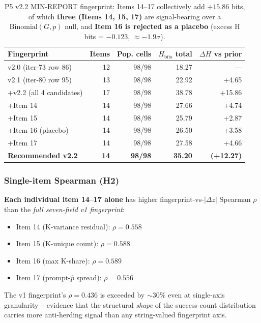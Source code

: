 \begin{table}[ht]
\centering
\small
\caption{P5 v2.2 MIN-REPORT fingerprint: Items 14--17 collectively add
$+15.86$ bits, of which \textbf{three (Items 14, 15, 17)} are signal-bearing
over a $\mathrm{Binomial}(G,p)$ null, and \textbf{Item 16 is rejected as
a placebo} (excess H bits = $-0.123$, $\approx -1.9\sigma$).}
\label{tab:p5-v22-uplift}
\begin{tabular}{l r r r r}
\toprule
Fingerprint & Items & Pop. cells & $H_{\mathrm{bits}}$ total & $\Delta H$ vs prior \\
\midrule
v2.0 (iter-73 row 86)        & 12  & 98/98 & 18.27 & --- \\
v2.1 (iter-80 row 95)        & 13  & 98/98 & 22.92 & +4.65 \\
+v2.2 (all 4 candidates)     & 17  & 98/98 & 38.78 & +15.86 \\
\quad +Item 14               & 14 & 98/98 & 27.66 & +4.74 \\
\quad +Item 15               & 14 & 98/98 & 25.79 & +2.87 \\
\quad +Item 16 (placebo)     & 14 & 98/98 & 26.50 & +3.58 \\
\quad +Item 17               & 14 & 98/98 & 27.58 & +4.66 \\
\midrule
\textbf{Recommended v2.2}    & \textbf{14} & \textbf{98/98} & \textbf{35.20} & \textbf{(+12.27)} \\
\bottomrule
\end{tabular}
\end{table}

\subsubsection{Single-item Spearman (H2)}
\textbf{Each individual item 14--17 alone} has higher fingerprint-vs-$|\Delta z|$
Spearman $\rho$ than the \emph{full seven-field v1 fingerprint}:
\begin{itemize}
  \item Item 14 (K-variance residual): $\rho = 0.558$
  \item Item 15 (K-unique count): $\rho = 0.588$
  \item Item 16 (max K-share): $\rho = 0.589$
  \item Item 17 (prompt-$\hat p$ spread): $\rho = 0.556$
\end{itemize}
The v1 fingerprint's $\rho = 0.436$ is exceeded by $\sim 30\%$ even at
single-axis granularity -- evidence that the structural \emph{shape} of
the success-count distribution carries more anti-herding signal than
any string-valued fingerprint axis.

